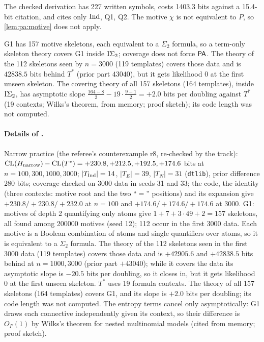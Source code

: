 \noindent The checked derivation has 227 written symbols, costs 1403.3 bits against a 15.4-bit citation, and cites only $\mathrm{Ind}$, Q1, Q2. The motive $\chi$ is not equivalent to $P$, so \cref{lem:pa:motive} does not apply.

\begin{example}[G1 keeps $\PA$]\pabrk{}\label{ex:pa:skel}
G1 has 157 motive skeletons, each equivalent to a $\Sigma_2$ formula, so a term-only skeleton theory covers G1 inside $\mathrm{I}\Sigma_{2}$; coverage does not force $\PA$. The theory of the 112 skeletons seen by $n=3000$ (119 templates) covers those data and is $42838.5$ bits behind $T^*$ (prior part $43040$), but it gets likelihood $0$ at the first unseen skeleton. The covering theory of all 157 skeletons (164 templates), inside $\mathrm{I}\Sigma_{2}$, has asymptotic slope $\frac{164-8}2-19\cdot\frac{9-1}2=+2.0$ bits per doubling against $T^*$ (19 contexts; Wilks's theorem, from memory; proof sketch); its code length was not computed.
\end{example}

\paragraph{Details of .} Narrow practice (the referee's counterexample r8, re-checked by the track): $\mathrm{CL}(H_{\mathrm{narrow}})-\mathrm{CL}(T^*)=+230.8,+212.5,+192.5,+174.6$ bits at $n=100,300,1000,3000$; $|T_{\mathrm{Ind}}|=14$, $|T_E|=39$, $|T_N|=31$ (\texttt{dtlib}), prior difference 280 bits; coverage checked on 3000 data in seeds 31 and 33; the code, the identity (three contexts: motive root and the two ``$=$'' positions) and its expansion give $+230.8/+230.8/+232.0$ at $n=100$ and $+174.6/+174.6/+174.6$ at $3000$. G1: motives of depth 2 quantifying only atoms give $1+7+3\cdot49+2=157$ skeletons, all found among 200000 motives (seed 12); 112 occur in the first 3000 data. Each motive is a Boolean combination of atoms and single quantifiers over atoms, so it is equivalent to a $\Sigma_2$ formula. The theory of the 112 skeletons seen in the first 3000 data (119 templates) covers those data and is $+42905.6$ and $+42838.5$ bits behind at $n=1000,3000$ (prior part $+43040$); while it covers the data its asymptotic slope is $-20.5$ bits per doubling, so it closes in, but it gets likelihood $0$ at the first unseen skeleton. $T^*$ uses 19 formula contexts. The theory of all 157 skeletons (164 templates) covers G1, and its slope is $+2.0$ bits per doubling; its code length was not computed. The entropy terms cancel only asymptotically: G1 draws each connective independently given its context, so their difference is $O_P(1)$ by Wilks's theorem for nested multinomial models (cited from memory; proof sketch).

